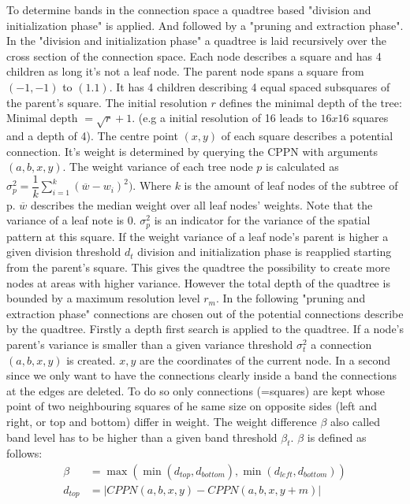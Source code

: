 To determine bands in the connection space a quadtree based "division and initialization phase" is applied. And followed by a "pruning and extraction phase". 
In the "division and initialization phase" a quadtree is laid recursively over the cross section of the connection space. Each node describes a square and has 4 children as long it's not a leaf node. The parent node spans a square from $(-1,-1)$ to $(1.1)$. It has 4 children describing 4 equal spaced subsquares of the parent's square. The initial resolution $r$ defines the minimal depth of the tree: Minimal depth $= \sqrt{r}+1$. (e.g a initial resolution of 16 leads to $16x16$ squares and a depth of 4). The centre point $(x,y)$ of each square describes a potential connection. It's weight is determined by querying the CPPN with arguments $(a,b,x,y)$. The weight variance of each tree node $p$ is calculated as $\sigma^2_p = \dfrac{1}{k}\displaystyle\sum_{i=1}^{k} (\overline{w}-w_i)^2)$. Where $k$ is the amount of leaf nodes of the subtree of p. $\overline{w}$ describes the median weight over all leaf nodes' weights. Note that the variance of a leaf note is $0$. $\sigma^2_p$ is an indicator for the variance of the spatial pattern at this square. If the weight variance of a leaf node's parent is higher a given division threshold $d_t$ division and initialization phase is reapplied starting from the parent's square. This gives the quadtree the possibility to create more nodes at areas with higher variance. However the total depth of the quadtree is bounded by a maximum resolution level $r_m$.
In the following "pruning and extraction phase" connections are chosen out of the potential connections describe by the quadtree. 
Firstly a depth first search is applied to the quadtree. If a node's parent's variance is smaller than a given variance threshold $\sigma^2_t$ a connection $(a,b,x,y)$ is created. $x,y$ are the coordinates of the current node. In a second since we only want to have the connections clearly inside a band the connections at the edges are deleted. To do so only connections (=squares) are kept whose point of two neighbouring squares of he same size on opposite sides (left and right, or top and bottom) differ in weight. The weight difference $\beta$ also called band level has to be higher than a given band threshold $\beta_t$. $\beta$ is defined as follows:
\label{lbl:weight difference}
\begin{align*}
	\beta &= \max(\min(d_{top},d_{bottom}),\min(d_{left},d_{bottom}))\\
	d_{top} &= |CPPN(a,b,x,y)-CPPN(a,b,x,y+m)|
\end{align*}  
